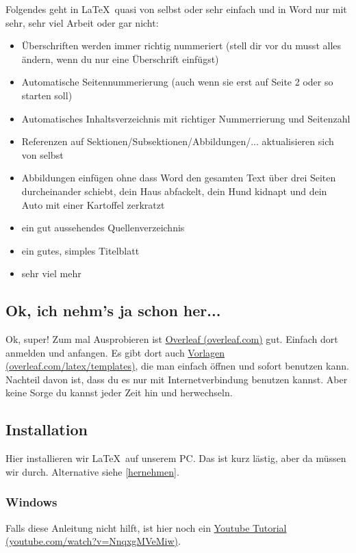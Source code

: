 \documentclass{article}
\begin{document}
Folgendes geht in \LaTeX\ quasi von selbst oder sehr einfach und in Word nur mit sehr, sehr viel Arbeit oder gar nicht:
\begin{itemize}
    \item Überschriften werden immer richtig nummeriert (stell dir vor du musst alles ändern, wenn du nur eine Überschrift einfügst)
    \item Automatische Seitennummerierung (auch wenn sie erst auf Seite 2 oder so starten soll)
    \item Automatisches Inhaltsverzeichnis mit richtiger Nummerrierung und Seitenzahl
    \item Referenzen auf Sektionen/Subsektionen/Abbildungen/... aktualisieren sich von selbst
    \item Abbildungen einfügen ohne dass Word den gesamten Text über drei Seiten durcheinander schiebt, dein Haus abfackelt, dein Hund kidnapt und dein Auto mit einer Kartoffel zerkratzt
    \item ein gut aussehendes Quellenverzeichnis
    \item ein gutes, simples Titelblatt
    \item sehr viel mehr
\end{itemize}

\subsection{Ok, ich nehm's ja schon her...} \label{hernehmen}

Ok, super! 
Zum mal Ausprobieren ist \href{https://www.overleaf.com/}{Overleaf (overleaf.com)} gut.
Einfach dort anmelden und anfangen.
Es gibt dort auch \href{https://www.overleaf.com/latex/templates}{Vorlagen (overleaf.com/latex/templates)}, die man einfach öffnen und sofort benutzen kann. \\

Nachteil davon ist, dass du es nur mit Internetverbindung benutzen kannst.
Aber keine Sorge du kannst jeder Zeit hin und herwechseln.

\subsection{Installation} \label{Installation}

Hier installieren wir \LaTeX\ auf unserem PC. 
Das ist kurz lästig, aber da müssen wir durch. Alternative siehe \autoref{hernehmen}.

\subsubsection{Windows}
Falls diese Anleitung nicht hilft, ist hier noch ein \href{https://www.youtube.com/watch?v=NnqxgMVeMiw}{Youtube Tutorial (youtube.com/watch?v=NnqxgMVeMiw)}.\\
\end{document}
